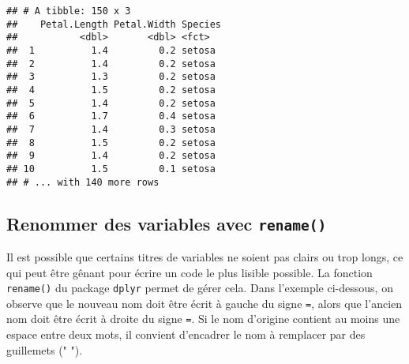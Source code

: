 \documentclass[
  french,
]{book}
\newenvironment{Shaded}{\begin{snugshade}}{\end{snugshade}}
\newcommand{\DataTypeTok}[1]{\textcolor[rgb]{0.13,0.29,0.53}{#1}}
\newcommand{\KeywordTok}[1]{\textcolor[rgb]{0.13,0.29,0.53}{\textbf{#1}}}
\newcommand{\NormalTok}[1]{#1}
\newcommand{\OperatorTok}[1]{\textcolor[rgb]{0.81,0.36,0.00}{\textbf{#1}}}
\newcommand{\StringTok}[1]{\textcolor[rgb]{0.31,0.60,0.02}{#1}}
\begin{document}
\begin{Shaded}
\end{Shaded}

\begin{verbatim}
## # A tibble: 150 x 3
##    Petal.Length Petal.Width Species
##           <dbl>       <dbl> <fct>  
##  1          1.4         0.2 setosa 
##  2          1.4         0.2 setosa 
##  3          1.3         0.2 setosa 
##  4          1.5         0.2 setosa 
##  5          1.4         0.2 setosa 
##  6          1.7         0.4 setosa 
##  7          1.4         0.3 setosa 
##  8          1.5         0.2 setosa 
##  9          1.4         0.2 setosa 
## 10          1.5         0.1 setosa 
## # ... with 140 more rows
\end{verbatim}

\hypertarget{renommer-des-variables-avec-rename}{%
\subsection{\texorpdfstring{Renommer des variables avec \texttt{rename()}}{Renommer des variables avec rename()}}\label{renommer-des-variables-avec-rename}}

Il est possible que certains titres de variables ne soient pas clairs ou trop longs, ce qui peut être gênant pour écrire un code le plus lisible possible. La fonction \texttt{rename()} du package \texttt{dplyr} permet de gérer cela. Dans l'exemple ci-dessous, on observe que le nouveau nom doit être écrit à gauche du signe \texttt{=}, alors que l'ancien nom doit être écrit à droite du signe \texttt{=}. Si le nom d'origine contient au moins une espace entre deux mots, il convient d'encadrer le nom à remplacer par des guillemets (" ").

\begin{Shaded}
\end{Shaded}
\end{document}
